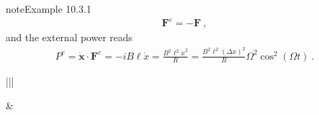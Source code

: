 \documentclass[letterpaper,10pt,english]{jupyterBook}
\begin{document}
\begin{sphinxadmonition}{note}{Example 10.3.1}
\begin{equation*}
\begin{split}\mathbf{F}^e = - \mathbf{F} \ ,\end{split}
\end{equation*}
\sphinxAtStartPar
and the external power reads
\begin{equation*}
\begin{split}P^e = \dot{\mathbf{x}} \cdot \mathbf{F}^e = - i B \ell \dot{x} = \frac{B^2 \ell^2 \dot{x}^2}{R} = \frac{B^2 \ell^2 \left(\Delta x\right)^2}{R} \Omega^2 \cos^2(\Omega t) \ .\end{split}
\end{equation*}

\begin{savenotes}\sphinxattablestart
\centering
\begin{tabular}[t]{|||}
\hline

\sphinxAtStartPar
{}
&
\sphinxAtStartPar
{}
\\
\hline
\end{tabular}
\par
\sphinxattableend\end{savenotes}


\end{sphinxadmonition}
\end{document}
